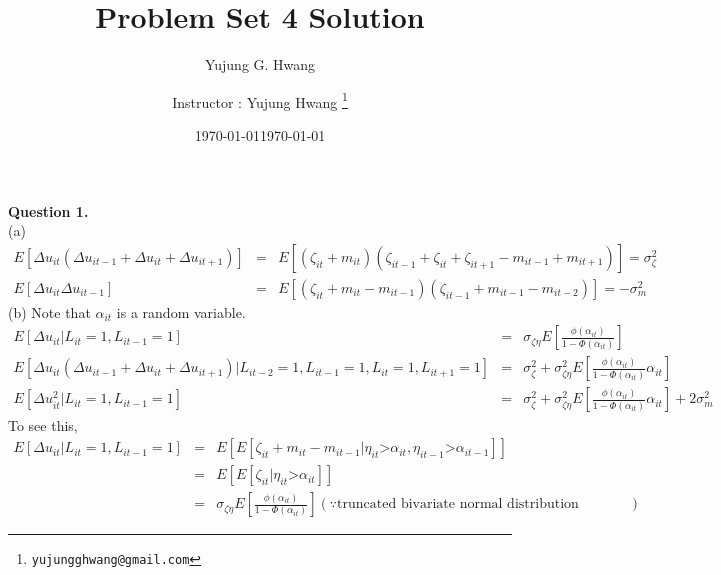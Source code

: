 \documentclass[paper=a4, fontsize=13pt]{extarticle} %
\author{Yujung G. Hwang} %
\date{\today} %
\numberwithin{equation}{section} %
\numberwithin{figure}{section} %
\numberwithin{table}{section} %
\begin{document}
\title{	
\normalfont \normalsize 
\huge Problem Set 4 Solution
}
\author{
Instructor : Yujung Hwang \thanks{\texttt{yujungghwang@gmail.com}}} %
\date{\today} %
\maketitle %

\upshape \mdseries 
\normalsize

\textbf{Question 1.} \\
(a) 
\begin{eqnarray*}
E \left[ \Delta u_{it} (\Delta u_{it-1} + \Delta u_{it} + \Delta u_{it+1}) \right] &=& E \left[ (\zeta_{it} + m_{it}) ( \zeta_{it-1} + \zeta_{it} + \zeta_{it+1} - m_{it-1} + m_{it+1} ) \right] = \sigma_{\zeta}^2 \\
E \left[ \Delta u_{it} \Delta u_{it-1} \right] &=& E \left[ (\zeta_{it} + m_{it} - m_{it-1}) (\zeta_{it-1} + m_{it-1} - m_{it-2}) \right] = -\sigma_{m}^2 
\end{eqnarray*}
(b)
Note that $\alpha_{it}$ is a random variable.
\begin{eqnarray*}
E \left[ \Delta u_{it} | L_{it}=1, L_{it-1}=1 \right] &=& \sigma_{\zeta \eta} E \left[ \frac{\phi(\alpha_{it})}{1-\Phi(\alpha_{it})} \right] \\
E \left[ \Delta u_{it} (\Delta u_{it-1} + \Delta u_{it} + \Delta u_{it+1}) | L_{it-2} =1, L_{it-1}=1, L_{it}=1, L_{it+1}=1  \right] &=& \sigma_{\zeta}^2 + \sigma_{\zeta \eta}^2 E\left[ \frac{\phi (\alpha_{it})}{1-\Phi (\alpha_{it})} \alpha_{it}  \right] \\
E \left[ \Delta u_{it}^2 | L_{it}=1, L_{it-1}=1 \right] &=&  \sigma_{\zeta}^2 + \sigma_{\zeta \eta}^2 E\left[ \frac{\phi (\alpha_{it})}{1-\Phi (\alpha_{it})} \alpha_{it} \right] + 2 \sigma_m^2  \end{eqnarray*}
To see this, 
\begin{eqnarray*}
E \left[ \Delta u_{it} | L_{it}=1, L_{it-1}=1 \right] &=& E\left[ E \left[ \zeta_{it} + m_{it} - m_{it-1} | \eta_{it} \mbox{>} \alpha_{it}, \eta_{it-1} \mbox{>} \alpha_{it-1} \right] \right] \\
&=& E\left[ E \left[ \zeta_{it} | \eta_{it} \mbox{>} \alpha_{it} \right] \right] \\
&=& \sigma_{\zeta \eta} E \left[ \frac{\phi(\alpha_{it})}{1-\Phi(\alpha_{it})} \right] (\because \mbox{truncated bivariate normal distribution formula})
\end{eqnarray*}
\end{document}

